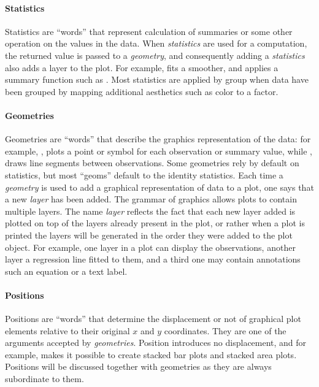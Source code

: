 \documentclass[krantz2]{krantz}\usepackage{knitr}
\begin{document}
\paragraph{Statistics}
Statistics are ``words'' that represent calculation of summaries or some other operation on the values in the data. When \emph{statistics} are used for a computation, the returned value is passed to a \emph{geometry}, and consequently adding a \emph{statistics} also adds a layer to the plot. For example,  fits a smoother, and  applies a summary function such as . Most statistics are applied by group when data have been grouped by mapping additional aesthetics such as color to a factor.

\paragraph{Geometries}
\sloppy%
Geometries are ``words'' that describe the graphics representation of the data: for example, , plots a point or symbol for each observation or summary value, while , draws line segments between observations. Some geometries rely by default on statistics, but most ``geoms'' default to the identity statistics. Each time a \emph{geometry} is used to add a graphical representation of data to a plot, one says that a new \emph{layer} has been added. The grammar of graphics allows plots to contain multiple layers. The name \emph{layer} reflects the fact that each new layer added is plotted on top of the layers already present in the plot, or rather when a plot is printed the layers will be generated in the order they were added to the plot object. For example, one layer in a plot can display the observations, another layer a regression line fitted to them, and a third one may contain annotations such an equation or a text label.

\paragraph{Positions}
Positions are ``words'' that determine the displacement or not of graphical plot elements relative to their original $x$ and $y$ coordinates. They are one of the arguments accepted by \emph{geometries}. Position  introduces no displacement, and for example,  makes it possible to create stacked bar plots and stacked area plots. Positions will be discussed together with geometries as they are always subordinate to them.
\end{document}
